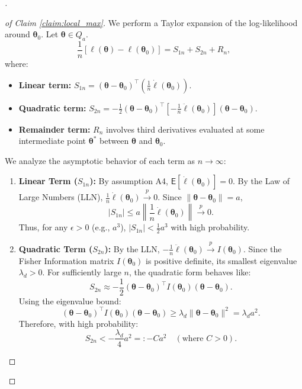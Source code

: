 \begin{proof}[]
\begin{enumerate}
\begin{proof}[of Claim \ref{claim:local_max}]
    We perform a Taylor expansion of the log-likelihood around $\boldsymbol{\theta}_0$. Let $\boldsymbol{\theta} \in Q_a$.
    \[
    \frac{1}{n} [\ell(\boldsymbol{\theta}) - \ell(\boldsymbol{\theta}_0)] = S_{1n} + S_{2n} + R_n,
    \]
    where:
    \begin{itemize}
        \item \textbf{Linear term:} $S_{1n} = (\boldsymbol{\theta} - \boldsymbol{\theta}_0)^{\top} \left( \frac{1}{n} \dot{\ell}(\boldsymbol{\theta}_0) \right)$.
        \item \textbf{Quadratic term:} $S_{2n} = -\frac{1}{2} (\boldsymbol{\theta} - \boldsymbol{\theta}_0)^{\top} \left[ -\frac{1}{n} \ddot{\ell}(\boldsymbol{\theta}_0) \right] (\boldsymbol{\theta} - \boldsymbol{\theta}_0)$.
        \item \textbf{Remainder term:} $R_n$ involves third derivatives evaluated at some intermediate point $\boldsymbol{\theta}^*$ between $\boldsymbol{\theta}$ and $\boldsymbol{\theta}_0$.
    \end{itemize}

    We analyze the asymptotic behavior of each term as $n \to \infty$:

    \begin{enumerate}
        \item \textbf{Linear Term ($S_{1n}$):}
        By assumption A4, $\mathsf{E}[\dot{\ell}(\boldsymbol{\theta}_0)] = 0$. By the Law of Large Numbers (LLN), $\frac{1}{n} \dot{\ell}(\boldsymbol{\theta}_0) \stackrel{p}{\longrightarrow} 0$. Since $\|\boldsymbol{\theta} - \boldsymbol{\theta}_0\| = a$,
        \[ |S_{1n}| \le a \left\| \frac{1}{n} \dot{\ell}(\boldsymbol{\theta}_0) \right\| \stackrel{p}{\longrightarrow} 0. \]
        Thus, for any $\epsilon > 0$ (e.g., $a^3$), $|S_{1n}| < \frac{1}{2}a^3$ with high probability.

        \item \textbf{Quadratic Term ($S_{2n}$):}
        By the LLN, $-\frac{1}{n} \ddot{\ell}(\boldsymbol{\theta}_0) \stackrel{p}{\longrightarrow} I(\boldsymbol{\theta}_0)$.
        Since the Fisher Information matrix $I(\boldsymbol{\theta}_0)$ is positive definite, its smallest eigenvalue $\lambda_d > 0$.
        For sufficiently large $n$, the quadratic form behaves like:
        \[ S_{2n} \approx -\frac{1}{2} (\boldsymbol{\theta} - \boldsymbol{\theta}_0)^{\top} I(\boldsymbol{\theta}_0) (\boldsymbol{\theta} - \boldsymbol{\theta}_0). \]
        Using the eigenvalue bound:
        \[ (\boldsymbol{\theta} - \boldsymbol{\theta}_0)^{\top} I(\boldsymbol{\theta}_0) (\boldsymbol{\theta} - \boldsymbol{\theta}_0) \ge \lambda_d \|\boldsymbol{\theta} - \boldsymbol{\theta}_0\|^2 = \lambda_d a^2. \]
        Therefore, with high probability:
        \[ S_{2n} < -\frac{\lambda_d}{4} a^2 =: -C a^2 \quad (\text{where } C > 0). \]


\end{enumerate}
\end{proof}
\end{enumerate}
\end{proof}
